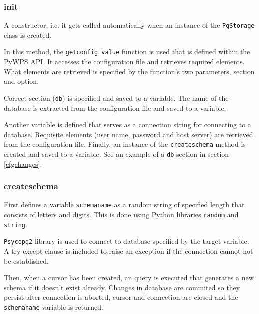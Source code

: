 \subsubsection{\textunderscore \textunderscore init\textunderscore \textunderscore } 
A constructor, i.e. it gets called automatically when an instance of
the \texttt{PgStorage} class is created.

In this method, the \texttt{get\textunderscore config\textunderscore
  value} function is used that is defined within the PyWPS API. It
accesses the configuration file and retrieves required elements. What
elements are retrieved is specified by the function's two parameters,
section and option.

Correct section (\texttt{db}) is specified and saved to a
variable. The name of the database is extracted from the
configuration file and saved to a variable.

Another variable is defined that serves as a connection string for
connecting to a database. Requisite elements (user name, password and
host server) are retrieved from the configuration file. Finally, an
instance of the \texttt{\textunderscore create\textunderscore schema}
method is created and saved to a variable. See an example of a \texttt{db}
section in section \ref{cfgchanges}.


\subsubsection{\textunderscore create\textunderscore schema} 

First defines a variable \texttt{schema\textunderscore name} as a
random string of specified length that consists of letters and
digits. This is done using Python libraries \texttt{random} and
\texttt{string}.
 
\texttt{Psycopg2} library is used to connect to database
specified by the target variable. A try-except clause is included to raise
an exception if the connection cannot not be established.

Then, when a cursor has been created, an  query is executed
that generates a new schema if it doesn't exist already. Changes in database are
commited so they persist after connection is aborted, cursor and
connection are closed and the \texttt{schema\textunderscore name}
variable is returned.

